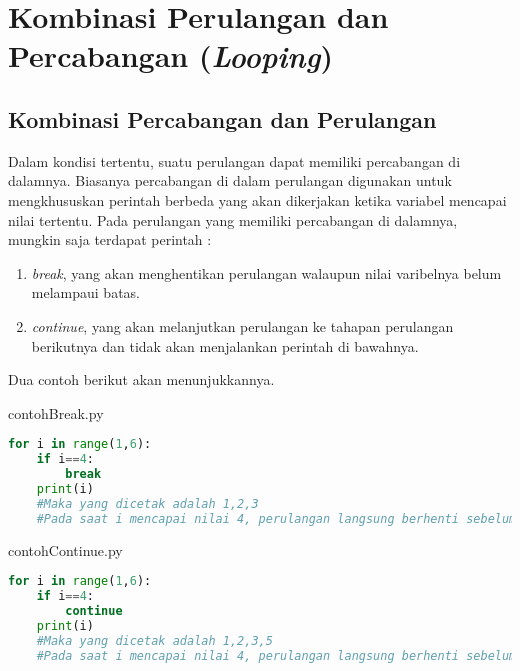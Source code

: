 \chapter{Kombinasi Perulangan dan Percabangan (\textit{Looping})}


\section{Kombinasi Percabangan dan Perulangan}
Dalam kondisi tertentu, suatu perulangan dapat memiliki percabangan di dalamnya. Biasanya percabangan di dalam perulangan digunakan untuk mengkhususkan perintah berbeda yang akan dikerjakan ketika variabel mencapai nilai tertentu. Pada perulangan yang memiliki percabangan di dalamnya, mungkin saja terdapat perintah :
\begin{enumerate}
	\item \textit{break}, yang akan menghentikan perulangan walaupun nilai varibelnya belum melampaui batas.
	\item \textit{continue}, yang akan melanjutkan perulangan ke tahapan perulangan berikutnya dan tidak akan menjalankan perintah di bawahnya.
\end{enumerate}
Dua contoh berikut akan menunjukkannya.

\begin{listprog}{contohBreak.py}
	\label{lst:contohBreak}
	\begin{lstlisting}[language=Python]
	for i in range(1,6):
    if i==4:
        break
    print(i)
	#Maka yang dicetak adalah 1,2,3
	#Pada saat i mencapai nilai 4, perulangan langsung berhenti sebelum sempat mencetak

	\end{lstlisting}
\end{listprog}

\FloatBarrier
\begin{listprog}{contohContinue.py}
	\label{lst:contohContinue}
	\begin{lstlisting}[language=Python]
	for i in range(1,6):
    if i==4:
        continue
    print(i)
	#Maka yang dicetak adalah 1,2,3,5
	#Pada saat i mencapai nilai 4, perulangan langsung berhenti sebelum sempat mencetak

	\end{lstlisting}
\end{listprog}



